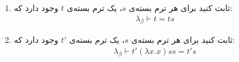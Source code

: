 \begin{enumerate}[label= (\alph*)]
    \item 
        ثابت کنید برای هر ترم بسته‌ی $s$، یک ترم بسته‌ی $t$ وجود دارد که:
        \begin{gather*}
            \lambda_\beta \vdash t = ts
        \end{gather*}
    \item 
        ثابت کنید برای هر ترم بسته‌ی $s$، یک ترم بسته‌ی $t'$ وجود دارد که:
        \begin{gather*}
            \lambda_\beta \vdash t' (\lambda x.x)ss = t's
        \end{gather*}
\end{enumerate}